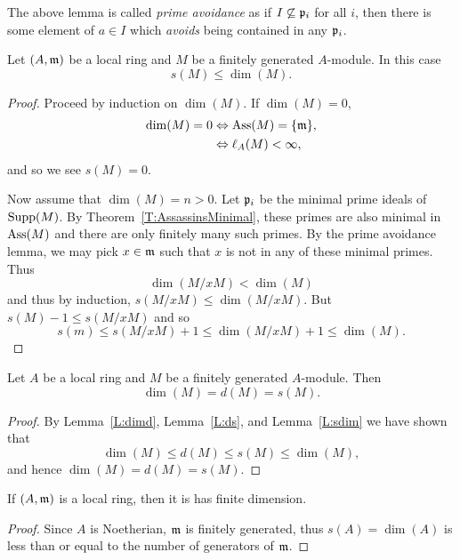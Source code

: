 \documentclass{ximera}
\begin{document}
\begin{remark}
  The above lemma is called \textit{prime avoidance} as if
  $I\not\subseteq \mathfrak{p}_i$ for all $i$, then there is some element of $a
  \in I$ which \textit{avoids} being contained in any $\mathfrak{p}_i$.
\end{remark}




\begin{lemma}\label{L:sdim}
  Let $(A,\mathfrak{m})$ be a local ring and $M$ be a finitely generated
  $A$-module. In this case
  \[
  s(M)\le \dim(M).
  \]
  \begin{proof}
    Proceed by induction on $\dim(M)$. If $\dim(M) = 0$,
    \begin{align*}
      \dim(M) = 0 &\Leftrightarrow \operatorname{Ass}(M)=\{\mathfrak{m}\}, \\
      &\Leftrightarrow \ell_A(M) <\infty,
    \end{align*}
    and so we see $s(M) = 0$.
    
    Now assume that $\dim(M)=n>0$. Let $\mathfrak{p}_i$ be the minimal prime
    ideals of $\operatorname{Supp}(M)$. By Theorem~\ref{T:AssassinsMinimal}, these
    primes are also minimal in $\operatorname{Ass}(M)$ and there are only finitely
    many such primes. By the prime avoidance
    lemma, we may pick $x\in\mathfrak{m}$ such that $x$ is not in any of these
    minimal primes. Thus
    \[
    \dim(M/xM) <\dim(M)
    \]
    and thus by induction, $s(M/xM)\le\dim(M/xM)$. But $s(M)-1\le s(M/xM)$ and so
    \[
    s(m) \le s(M/xM) +1 \le \dim(M/xM) +1 \le \dim(M).
    \]
  \end{proof}
\end{lemma}



\begin{theorem}\label{T:dimension}
  Let $A$ be a local ring and $M$ be a finitely generated
  $A$-module. Then
  \[
  \dim(M) = d(M) = s(M).
  \]
  \begin{proof}
    By Lemma~\ref{L:dimd}, Lemma~\ref{L:ds}, and Lemma~\ref{L:sdim} we have shown that
    \[
    \dim(M)\le d(M) \le s(M) \le \dim(M),
    \]
    and hence $\dim(M) = d(M) = s(M)$.
  \end{proof}
\end{theorem}



\begin{corollary}
  If $(A,\mathfrak{m})$ is a local ring, then it is has finite dimension.
  \begin{proof}
    Since $A$ is Noetherian, $\mathfrak{m}$ is finitely generated, thus
    $s(A)=\dim(A)$ is less than or equal to the number of generators of
    $\mathfrak{m}$.
  \end{proof}
\end{corollary}
\end{document}
